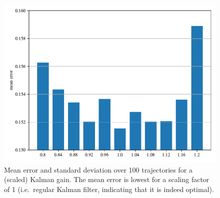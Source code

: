 \begin{figure}[h]
    \centering
    \includegraphics[width=\textwidth]{q3_2.pdf}
    \vspace{-5mm}
    \caption{Mean error and standard deviation over 100 trajectories for a (scaled) Kalman gain. The mean error is lowest for a scaling factor of 1 (i.e.~regular Kalman filter, indicating that it is indeed optimal).}
    \label{fig:error}
\end{figure}
\clearpage